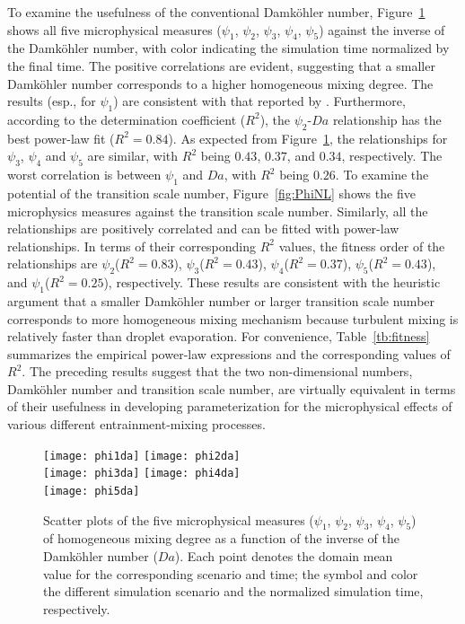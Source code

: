 \documentclass[draft,linenumbers]{agujournal}
\newcommand{\Fig}[1]{Figure~\ref{#1}}
\newcommand{\Table}[1]{Table~\ref{#1}}
\begin{document}
To examine the usefulness of the conventional Damk\"{o}hler number, 
\Fig{fig:PhiDa} shows all five microphysical measures ($\psi_1$, $\psi_2$, $\psi_3$, $\psi_4$, $\psi_5$) against the inverse of the Damk\"{o}hler number, with color indicating the simulation time normalized by the final time. The positive correlations are evident, suggesting that a smaller Damk\"{o}hler number corresponds to a higher homogeneous mixing degree. The results (esp., for $\psi_1$) are consistent with that reported by \citet{And09}. Furthermore, according to the determination coefficient ($R^2$), the $\psi_2$-$Da$ relationship has the best power-law fit ($R^2 = 0.84$). As expected from \Fig{fig:PhiDa}, the relationships for $\psi_3$, $\psi_4$ and $\psi_5$ are similar, with $R^2$ being $0.43$, $0.37$, and $0.34$, respectively. The worst correlation is between $\psi_1$ and $Da$, with $R^2$ being $0.26$. To examine the potential of the transition scale number, \Fig{fig:PhiNL} shows the five microphysics measures against the transition scale number. Similarly, all the relationships are positively correlated and can be fitted with power-law relationships. In terms of their corresponding $R^2$ values, the fitness order of the relationships are $\psi_2$($R^2 = 0.83$), $\psi_3$($R^2 = 0.43$), $\psi_4$($R^2=0.37$), $\psi_5$($R^2=0.43$), and $\psi_1$($R^2 = 0.25$), respectively. These results are consistent with the heuristic argument that {\color{green} a smaller Damk\"{o}hler number or larger transition scale number corresponds to more homogeneous mixing mechanism because turbulent mixing is relatively faster than droplet evaporation. For convenience, \Table{tb:fitness} summarizes the empirical power-law expressions and the corresponding values of $R^2$. The preceding results suggest that the two non-dimensional numbers, Damk\"{o}hler number and transition scale number, are virtually equivalent in terms of their usefulness in developing parameterization for the microphysical effects of various different entrainment-mixing processes.}

\begin{figure}[!htbp]\centering
\texttt{[image: phi1da]}
\texttt{[image: phi2da]}\\
\texttt{[image: phi3da]}
\texttt{[image: phi4da]}\\
\texttt{[image: phi5da]}
\caption{Scatter plots of the five microphysical measures ($\psi_1$, $\psi_2$, $\psi_3$, $\psi_4$, $\psi_5$) of homogeneous mixing degree as a function of the inverse of the Damk\"ohler number ($Da$). Each point denotes the domain mean value for the corresponding scenario and time; the symbol and color the different simulation scenario and the normalized simulation time, respectively.\label{fig:PhiDa}}
\end{figure}
\end{document}
